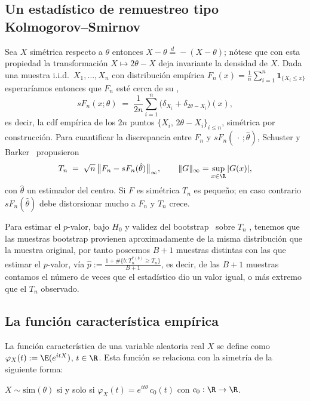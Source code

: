 \subsection{Un estadístico de remuestreo tipo Kolmogorov--Smirnov}

Sea $X$ simétrica respecto a $\theta$ entonces $X-\theta\overset{d}{=}-(X-\theta)$; nótese que con esta propiedad la transformación $X\mapsto 2\theta-X$ deja invariante la densidad de $X$. Dada una muestra i.i.d.\ $X_1,\dots,X_n$ con distribución empírica $F_n(x)=\frac{1}{n}\sum_{i=1}^{n}\mathbf{1}_{\{X_i\le x\}}$ esperaríamos entonces que $F_n$ esté cerca de su ,
\[
sF_n(x;\theta) \;=\; \frac{1}{2n}\sum_{i=1}^{n}\bigl(\delta_{X_i}+\delta_{2\theta-X_i}\bigr)(x),
\]
es decir, la cdf empírica de los $2n$ puntos $\{X_i,\,2\theta-X_i\}_{i\le n}$, simétrica por construcción. Para cuantificar la discrepancia entre $F_n$ y $sF_n(\,\cdot\,;\hat\theta)$, Schuster y Barker~\cite{schuster1987bootstrap} propusieron
\begin{equation}\label{eq:Tn}
T_n \;=\; \sqrt{n}\,\bigl\|F_n - sF_n(\hat\theta)\bigr\|_\infty,
\qquad \|G\|_\infty=\sup_{x\in\R}|G(x)|,
\end{equation}
con $\hat\theta$ un estimador del centro. Si $F$ es simétrica $T_n$ es pequeño; en caso contrario $sF_n(\hat\theta)$ debe distorsionar mucho a $F_n$ y $T_n$ crece.

Para estimar el $p$-valor, bajo $H_0$ y validez del bootstrap~\cite{arcones1991bootstrap} sobre $T_n$ , tenemos que las muestras bootstrap provienen aproximadamente de la misma distribución que la muestra original, por tanto poseemos $B+1$ muestras distintas  con  las que estimar el $p$-valor, vía $\hat{p}:= \frac{1+\#\{b:T_n^{*(b)}\ge T_n\}}{B+1}$, es decir, de las $B+1$ muestras contamos el número de veces que el estadístico dio un valor igual, o más extremo que el $T_n$ observado. 




\subsection{La función característica empírica}

La función característica de una variable aleatoria real $X$ se define como $\varphi_X(t):=\E(e^{itX})$, $t\in\R$. Esta función se relaciona con la simetría de la siguiente forma:

\begin{theorem}\label{thm:fc}
$X\sim\mathrm{sim}(\theta)$ si y solo si $\varphi_X(t)=e^{it\theta}\,c_0(t)$ con $c_0:\R\to\R$.
\end{theorem}

